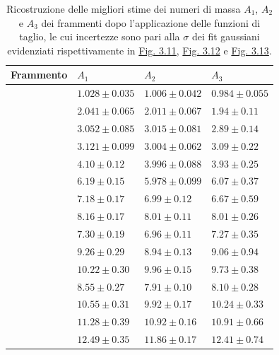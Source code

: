 \documentclass[12pt,a4paper,twoside]{report}
\begin{document}
	\begin{table}[H]
		\begin{minipage}{\textwidth}
			\centering
			\begin{tabular}{ |M{2.2cm}|M{3.0cm}|M{3.0cm}|M{3.0cm}| }
				\hline
				Frammento &$A_1$&$A_2$&$A_3$\\
				\hline\hline
				& $1.028\pm0.035$& $1.006\pm0.042$ &$0.984\pm0.055$\\
				\hline
				& $2.041\pm0.065$& $2.011\pm0.067$ &$1.94\pm0.11$\\
				\hline
				& $3.052\pm0.085 $& $3.015\pm0.081$ &$2.89 \pm0.14$ \\
				\hline
				& $3.121\pm0.099$& $3.004\pm0.062$ &$3.09\pm0.22$\\
				\hline
				& $4.10\pm0.12$& $3.996\pm0.088$ &$3.93\pm0.25$\\
				\hline
				& $6.19\pm0.15$& $5.978 \pm0.099 $ &$6.07 \pm0.37 $\\
				\hline
				& $7.18 \pm0.17 $& $6.99 \pm0.12 $ &$6.67\pm0.59$\\
				\hline
				& $8.16\pm0.17$& $8.01\pm0.11$ &$8.01\pm0.26$\\
				\hline
				& $7.30 \pm0.19 $& $6.96 \pm0.11 $ &$7.27 \pm0.35 $\\
				\hline
				& $9.26 \pm0.29 $& $8.94 \pm0.13 $ &$9.06\pm0.94$\\
				\hline
				& $10.22\pm0.30$& $9.96\pm0.15$ &$9.73\pm0.38$\\
				\hline
				& $8.55\pm0.27$& $7.91\pm0.10$ &$8.10\pm0.28$\\
				\hline
				& $10.55\pm0.31$& $9.92\pm0.17$ &$10.24\pm0.33$\\
				\hline
				& $11.28\pm0.39 $& $10.92\pm0.16 $ &$10.91\pm0.66$\\
				\hline
				& $12.49 \pm0.35 $& $11.86 \pm0.17 $ &$12.41 \pm0.74 $\\
				\hline
			\end{tabular}
		\end{minipage}
		\caption{Ricostruzione delle migliori stime dei numeri di massa $A_1$, $A_2$ e $A_3$ dei frammenti dopo l'applicazione delle funzioni di taglio, le cui incertezze sono pari alla $\sigma$ dei fit gaussiani evidenziati rispettivamente in \hyperref[fig:a1_fragments_final]{Fig. 3.11}, \hyperref[fig:a2_fragments_final]{Fig. 3.12} e \hyperref[fig:a3_fragments_final]{Fig. 3.13}.}
		\label{tab:mass_numbers}
	\end{table}
\end{document}
